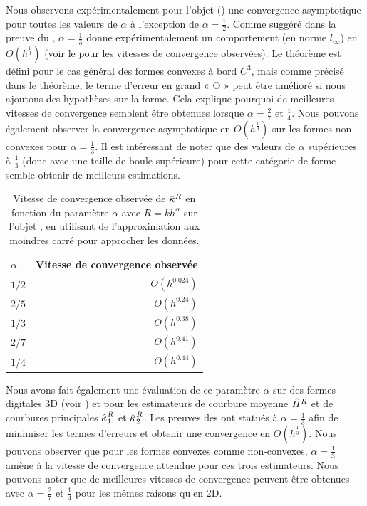 Nous observons expérimentalement pour l'objet \Ellipse
() une convergence asymptotique pour
toutes les valeurs de $\alpha$ à l'exception de $\alpha = \frac{1}{2}$. Comme
suggéré dans la preuve du , $\alpha =
\frac{1}{3}$ donne expérimentalement un comportement (en norme $l_\infty$) en
$O(h^\frac{1}{3})$ (voir le  pour les
vitesses de convergence observées). Le théorème est défini pour le cas général
des formes convexes à bord $C^3$, mais comme précisé dans le théorème, le terme
d'erreur en grand « O » peut être amélioré si nous ajoutons des hypothèses sur
la forme. Cela explique pourquoi de meilleures vitesses de convergence semblent
être obtenues lorsque $\alpha = \frac{2}{7}$ et $\frac{1}{4}$. Nous pouvons
également observer la convergence asymptotique en $O(h^\frac{1}{3})$ sur les
formes non-convexes pour $\alpha = \frac{1}{3}$. Il est intéressant de noter que
des valeurs de $\alpha$ supérieures à $\frac{1}{3}$ (donc avec une taille de
boule supérieure) pour cette catégorie de forme semble obtenir de meilleurs
estimations.
%
\begin{table}[ht]
\centering
%
\caption{Vitesse de convergence observée de $\hat{\kappa}^{R}$ en fonction du paramètre
$\alpha$ avec $R=kh^\alpha$ sur l'objet \Ellipse, en utilisant de
l'approximation aux moindres carré pour approcher les données.}
%
\label{tab:convergence-speed-alpha-2d}
\begin{tabular}{@{}lr@{}}
 $\alpha$ & Vitesse de convergence observée \\ \midrule
 $1/2$    & $O(h^{0.024})$                    \\
 $2/5$    & $O(h^{0.24})$                    \\
 $1/3$    & $O(h^{0.38})$                    \\
 $2/7$    & $O(h^{0.41})$                    \\
 $1/4$    & $O(h^{0.44})$                    \\ \bottomrule
\end{tabular}
\end{table}
%


Nous avons fait également une évaluation de ce paramètre $\alpha$ sur des formes
digitales 3D (voir ) \RoundedCube et
\Goursat pour les estimateurs de courbure moyenne $\hat{H}^{R}$ et de
courbures principales $\hat{\kappa_{}}_{1}^{R}$ et $\hat{\kappa_{}}_{2}^{R}$. Les preuves des
ont statués à $\alpha = \frac{1}{3}$ afin de minimiser les termes d'erreurs et
obtenir une convergence en $O(h^\frac{1}{3})$. Nous pouvons observer que pour les
formes convexes comme non-convexes, $\alpha = \frac{1}{3}$ amène à la vitesse de
convergence attendue pour ces trois estimateurs. Nous pouvons noter que de
meilleures vitesses de convergence peuvent être obtenues avec $\alpha =
\frac{2}{7}$ et $\frac{1}{4}$ pour les mêmes raisons qu'en 2D.


